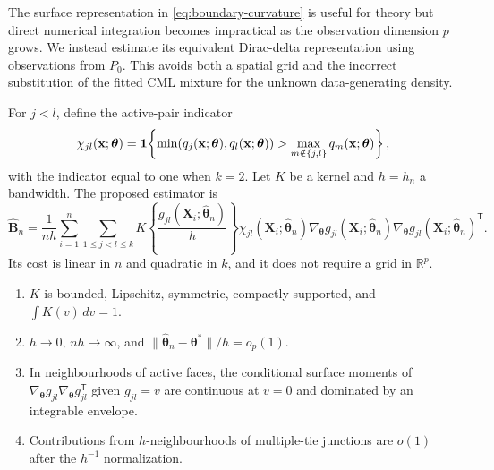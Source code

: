 The surface representation in \eqref{eq:boundary-curvature} is useful for
theory but direct numerical integration becomes impractical as the observation
dimension $p$ grows.  We instead estimate its equivalent Dirac-delta
representation using observations from $P_0$.  This avoids both a spatial grid
and the incorrect substitution of the fitted CML mixture for the unknown
data-generating density.

For $j<l$, define the active-pair indicator
\begin{equation}
 \chi_{jl}(\mathbf{x};\boldsymbol{\theta})
 =\mathbf 1\!\left\{
 \min(q_j(\mathbf{x};\boldsymbol{\theta}),q_l(\mathbf{x};\boldsymbol{\theta}))
 >\max_{m\notin\{j,l\}}q_m(\mathbf{x};\boldsymbol{\theta})
 \right\},
 \label{eq:active-pair-indicator}
\end{equation}
with the indicator equal to one when $k=2$.  Let $K$ be a kernel and $h=h_n$
a bandwidth.  The proposed estimator is
\begin{equation}
 \widehat{\mathbf{B}}_n
 =\frac{1}{nh}
 \sum_{i=1}^n\sum_{1\leq j<l\leq k}
 K\!\left\{\frac{g_{jl}(\mathbf{X}_i;\widehat{\boldsymbol{\theta}}_n)}{h}\right\}
 \chi_{jl}(\mathbf{X}_i;\widehat{\boldsymbol{\theta}}_n)
 \nabla_{\boldsymbol{\theta}}g_{jl}(\mathbf{X}_i;\widehat{\boldsymbol{\theta}}_n)
 \nabla_{\boldsymbol{\theta}}g_{jl}(\mathbf{X}_i;\widehat{\boldsymbol{\theta}}_n)^\mathsf T.
 \label{eq:boundary-estimator}
\end{equation}
Its cost is linear in $n$ and quadratic in $k$, and it does not require a grid
in $\mathbb R^p$.

\begin{assumption}
\label{ass:kernel-tube}
\begin{enumerate}
 \item $K$ is bounded, Lipschitz, symmetric, compactly supported, and
 $\int K(v)\,dv=1$.
 \item $h\to0$, $nh\to\infty$, and
 $\|\widehat{\boldsymbol{\theta}}_n-\boldsymbol{\theta}^*\|/h=o_p(1)$.
 \item In neighbourhoods of active faces, the conditional surface moments of
 $\nabla_{\boldsymbol{\theta}}g_{jl}\nabla_{\boldsymbol{\theta}}g_{jl}^\mathsf T$ given $g_{jl}=v$ are continuous at
 $v=0$ and dominated by an integrable envelope.
 \item Contributions from $h$-neighbourhoods of multiple-tie junctions are
 $o(1)$ after the $h^{-1}$ normalization.
\end{enumerate}
\end{assumption}

